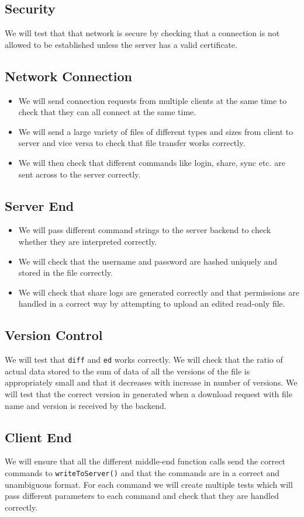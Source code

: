 \documentclass[]{article}
\newcommand{\ty}[1]{\texttt{#1}}
\begin{document}
\subsection{Security}
We will test that that network is secure by checking that a connection is not allowed to be established unless the server has a valid certificate.
\subsection{Network Connection}
\begin{itemize}
\item We will send connection requests from multiple clients at the same time to check that they can all connect at the same time.
\item We will send a large variety of files of different types and sizes from client to server and vice versa to check that file transfer works correctly.
\item We will then check that different commands like login, share, sync etc. are sent across to the server correctly.
\end{itemize}
\subsection{Server End}
\begin{itemize}
\item We will pass different command strings to the server backend to check whether they are interpreted correctly.
\item We will check that the username and password are hashed uniquely and stored in the file correctly.
\item We will check that share logs are generated correctly and that permissions are handled in a correct way by attempting to upload an edited read-only file.
\end{itemize}
\subsection{Version Control}
We will test that \ty{diff} and \ty{ed} works correctly. We will check that the ratio of actual data stored to the sum of data of all the versions of the file is appropriately small and that it decreases with increase in number of versions. We will test that the correct version in generated when a download request with file name and version is received by the backend.
\subsection{Client End}
We will ensure that all the different middle-end function calls send the correct commands to \ty{writeToServer()} and that the commands are in a correct and unambiguous format. For each command we will create multiple tests which will pass different parameters to each command and check that they are handled correctly.  
\end{document}
